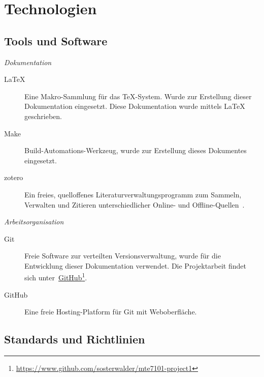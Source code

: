 \section{Technologien}
\label{sec:technologies}

\subsection{Tools und Software}
\label{subsec:tools_software}

\noindent\emph{Dokumentation}
\begin{description}
    \item[\LaTeX] Eine Makro-Sammlung für das \TeX-System. Wurde zur Erstellung
        dieser Dokumentation eingesetzt. Diese Dokumentation wurde mittels \LaTeX{} geschrieben.
    \item[Make] Build-Automations-Werkzeug, wurde zur Erstellung dieses Dokumentes eingesetzt.
    \item[zotero] Ein freies, quelloffenes Literaturverwaltungsprogramm zum Sammeln, Verwalten und Zitieren unterschiedlicher Online- und Offline-Quellen~\cite{wikipedia_foundation_zotero_2015}.
\end{description}

\noindent\emph{Arbeitsorganisation}
\begin{description}
    \item[Git] Freie Software zur verteilten Versionsverwaltung, wurde für die
        Entwicklung dieser Dokumentation verwendet. Die Projektarbeit findet sich
        unter~\href{https://www.github.com/sosterwalder/mte7101-project1}{GitHub}\footnote{\href{https://www.github.com/sosterwalder/mte7101-project1}{https://www.github.com/sosterwalder/mte7101-project1}}.
    \item[GitHub] Eine freie Hosting-Platform für Git mit Weboberfläche.
\end{description}

\subsection{Standards und Richtlinien}
\label{subsec:standards_guidelines}
